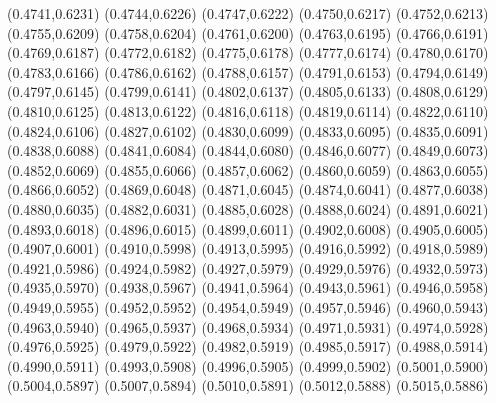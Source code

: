 \PST@Cross(0.4741,0.6231)
\PST@Cross(0.4744,0.6226)
\PST@Cross(0.4747,0.6222)
\PST@Cross(0.4750,0.6217)
\PST@Cross(0.4752,0.6213)
\PST@Cross(0.4755,0.6209)
\PST@Cross(0.4758,0.6204)
\PST@Cross(0.4761,0.6200)
\PST@Cross(0.4763,0.6195)
\PST@Cross(0.4766,0.6191)
\PST@Cross(0.4769,0.6187)
\PST@Cross(0.4772,0.6182)
\PST@Cross(0.4775,0.6178)
\PST@Cross(0.4777,0.6174)
\PST@Cross(0.4780,0.6170)
\PST@Cross(0.4783,0.6166)
\PST@Cross(0.4786,0.6162)
\PST@Cross(0.4788,0.6157)
\PST@Cross(0.4791,0.6153)
\PST@Cross(0.4794,0.6149)
\PST@Cross(0.4797,0.6145)
\PST@Cross(0.4799,0.6141)
\PST@Cross(0.4802,0.6137)
\PST@Cross(0.4805,0.6133)
\PST@Cross(0.4808,0.6129)
\PST@Cross(0.4810,0.6125)
\PST@Cross(0.4813,0.6122)
\PST@Cross(0.4816,0.6118)
\PST@Cross(0.4819,0.6114)
\PST@Cross(0.4822,0.6110)
\PST@Cross(0.4824,0.6106)
\PST@Cross(0.4827,0.6102)
\PST@Cross(0.4830,0.6099)
\PST@Cross(0.4833,0.6095)
\PST@Cross(0.4835,0.6091)
\PST@Cross(0.4838,0.6088)
\PST@Cross(0.4841,0.6084)
\PST@Cross(0.4844,0.6080)
\PST@Cross(0.4846,0.6077)
\PST@Cross(0.4849,0.6073)
\PST@Cross(0.4852,0.6069)
\PST@Cross(0.4855,0.6066)
\PST@Cross(0.4857,0.6062)
\PST@Cross(0.4860,0.6059)
\PST@Cross(0.4863,0.6055)
\PST@Cross(0.4866,0.6052)
\PST@Cross(0.4869,0.6048)
\PST@Cross(0.4871,0.6045)
\PST@Cross(0.4874,0.6041)
\PST@Cross(0.4877,0.6038)
\PST@Cross(0.4880,0.6035)
\PST@Cross(0.4882,0.6031)
\PST@Cross(0.4885,0.6028)
\PST@Cross(0.4888,0.6024)
\PST@Cross(0.4891,0.6021)
\PST@Cross(0.4893,0.6018)
\PST@Cross(0.4896,0.6015)
\PST@Cross(0.4899,0.6011)
\PST@Cross(0.4902,0.6008)
\PST@Cross(0.4905,0.6005)
\PST@Cross(0.4907,0.6001)
\PST@Cross(0.4910,0.5998)
\PST@Cross(0.4913,0.5995)
\PST@Cross(0.4916,0.5992)
\PST@Cross(0.4918,0.5989)
\PST@Cross(0.4921,0.5986)
\PST@Cross(0.4924,0.5982)
\PST@Cross(0.4927,0.5979)
\PST@Cross(0.4929,0.5976)
\PST@Cross(0.4932,0.5973)
\PST@Cross(0.4935,0.5970)
\PST@Cross(0.4938,0.5967)
\PST@Cross(0.4941,0.5964)
\PST@Cross(0.4943,0.5961)
\PST@Cross(0.4946,0.5958)
\PST@Cross(0.4949,0.5955)
\PST@Cross(0.4952,0.5952)
\PST@Cross(0.4954,0.5949)
\PST@Cross(0.4957,0.5946)
\PST@Cross(0.4960,0.5943)
\PST@Cross(0.4963,0.5940)
\PST@Cross(0.4965,0.5937)
\PST@Cross(0.4968,0.5934)
\PST@Cross(0.4971,0.5931)
\PST@Cross(0.4974,0.5928)
\PST@Cross(0.4976,0.5925)
\PST@Cross(0.4979,0.5922)
\PST@Cross(0.4982,0.5919)
\PST@Cross(0.4985,0.5917)
\PST@Cross(0.4988,0.5914)
\PST@Cross(0.4990,0.5911)
\PST@Cross(0.4993,0.5908)
\PST@Cross(0.4996,0.5905)
\PST@Cross(0.4999,0.5902)
\PST@Cross(0.5001,0.5900)
\PST@Cross(0.5004,0.5897)
\PST@Cross(0.5007,0.5894)
\PST@Cross(0.5010,0.5891)
\PST@Cross(0.5012,0.5888)
\PST@Cross(0.5015,0.5886)
